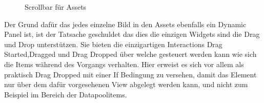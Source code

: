 \begin{figure}%
\centering
{}%
\qquad
{}%

\caption{Scrollbar für Assets}%
\label{fig:Prototyp_02}
\end{figure}

Der Grund dafür das jedes einzelne Bild in den Assets ebenfalls ein Dynamic Panel ist, ist der Tatsache geschuldet das dies die einzigen Widgets sind die Drag und Drop unterstützen.
Sie bieten die einzigartigen Interactions \glqq Drag Started\grqq{},\glqq Dragged\grqq{} und \glqq Drag Dropped\grqq{} über welche gesteuert werden kann wie sich die Items während des Vorgangs verhalten.
Hier erweist es sich vor allem als praktisch \glqq Drag Dropped\grqq{} mit einer If Bedingung zu versehen, damit das Element nur über dem dafür vorgesehenen View abgelegt werden kann, und nicht zum Beispiel im Bereich der Datapoolitems.

